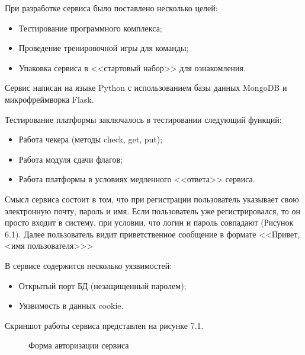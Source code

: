 При разработке сервиса было поставлено несколько целей:
\begin{itemize} 
\item Тестирование программного комплекса;
\item Проведение тренировочной игры для команды;
\item Упаковка сервиса в <<стартовый набор>> для ознакомления.
\end{itemize}

Сервис написан на языке Python с использованием базы данных MongoDB и микрофреймворка Flask.

Тестирование платформы заключалось в тестировании следующий функций:
\begin{itemize} 
\item Работа чекера (методы check, get, put);
\item Работа модуля сдачи флагов;
\item Работа платформы в условиях медленного <<ответа>> сервиса.
\end{itemize}

Смысл сервиса состоит в том, что при регистрации пользователь указывает свою электронную почту, пароль и имя.
Если пользователь уже регистрировался, то он просто входит в систему, при условии, что логин и пароль  совпадают (Рисунок 6.1). Далее пользователь видит приветственное сообщение в формате <<Привет, <имя пользователя>>>


В сервисе содержится несколько уязвимостей:
\begin{itemize} 
\item Открытый порт БД (незащищенный паролем);
\item Уязвимость в данных cookie.
\end{itemize}

Скриншот работы сервиса представлен на рисунке 7.1.

\begin{figure}[ht!]
\caption{Форма авторизации сервиса}
\end{figure} 
\newpage
